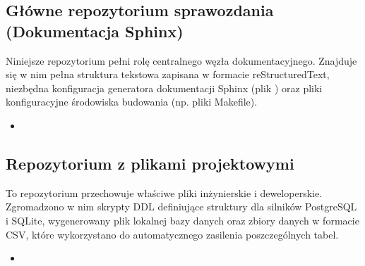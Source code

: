 \documentclass[a4paper,11pt,english,openany,oneside]{sphinxmanual}
\begin{document}
\subsection{Główne repozytorium sprawozdania (Dokumentacja Sphinx)}
\label{\detokenize{rozdzial_1/index:glowne-repozytorium-sprawozdania-dokumentacja-sphinx}}
\sphinxAtStartPar
Niniejsze repozytorium pełni rolę centralnego węzła dokumentacyjnego. Znajduje się w nim pełna struktura tekstowa zapisana w formacie reStructuredText, niezbędna konfiguracja generatora dokumentacji Sphinx (plik ) oraz pliki konfiguracyjne środowiska budowania (np. pliki Makefile).
\begin{itemize}
\item {} 
\sphinxAtStartPar
{} 

\end{itemize}


\subsection{Repozytorium z plikami projektowymi}
\label{\detokenize{rozdzial_1/index:repozytorium-z-plikami-projektowymi}}
\sphinxAtStartPar
To repozytorium przechowuje właściwe pliki inżynierskie i deweloperskie. Zgromadzono w nim skrypty DDL definiujące struktury dla silników PostgreSQL i SQLite, wygenerowany plik lokalnej bazy danych oraz zbiory danych w formacie CSV, które wykorzystano do automatycznego zasilenia poszczególnych tabel.
\begin{itemize}
\item {} 
\sphinxAtStartPar
{} 

\end{itemize}
\end{document}
